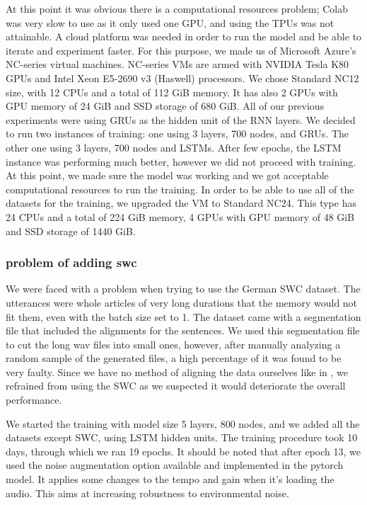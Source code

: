 At this point it was obvious there is a computational resources problem; Colab was very slow to use as it only used one GPU, and using the TPUs was not attainable. A cloud platform was needed in order to run the model and be able to iterate and experiment faster. For this purpose, we made us of Microsoft Azure's NC-series virtual machines. NC-series \ac{VM}s are armed with NVIDIA Tesla K80 GPUs and Intel Xeon E5-2690 v3 (Haswell) processors.
We chose Standard NC12 size, with 12 CPUs and a total of 112 GiB memory. It has also 2 GPUs with GPU memory of 24 GiB and SSD storage of 680 GiB.
All of our previous experiments were using \ac{GRU}s as the hidden unit of the \ac{RNN} layers. We decided to run two instances of training: one using 3 layers, 700 nodes, and \ac{GRU}s. The other one using 3 layers, 700 nodes and \ac{LSTM}s. After few epochs, the \ac{LSTM} instance was performing much better, however we did not proceed with training. At this point, we made sure the model was working and we got acceptable computational resources to run the training. In order to be able to use all of the datasets for the training, we upgraded the \ac{VM} to Standard NC24. This type has 24 CPUs and a total of 224 GiB memory, 4 GPUs with GPU memory of 48 GiB and SSD storage of 1440 GiB.


\subsubsection{problem of adding swc}
We were faced with a problem when trying to use the German \ac{SWC} dataset. The utterances were whole articles of very long durations that the memory would not fit them, even with the batch size set to 1. The dataset came with a segmentation file that included the alignments for the sentences. We used this segmentation file to cut the long wav files into small ones, however, after manually analyzing a random sample of the generated files, a high percentage of it was found to be very faulty. Since we have no method of aligning the data ourselves like in \cite{amodei2016deep}, we refrained from using the \ac{SWC} as we suspected it would deteriorate the overall performance.

We started the training with model size 5 layers, 800 nodes, and we added all the datasets except \ac{SWC}, using \ac{LSTM} hidden units. The training procedure took 10 days, through which we ran 19 epochs. It should be noted that after epoch 13, we used the noise augmentation option available and implemented in the pytorch model. It applies some changes to the tempo and gain when it's loading the audio. This aims at increasing robustness to environmental noise.

